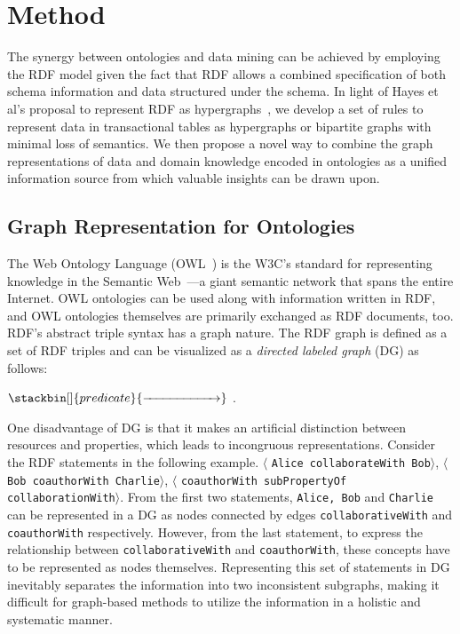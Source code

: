 \section{Method}
\label{sec:method}
The synergy between ontologies and data mining can be achieved by employing the RDF model given the fact that RDF allows a combined specification of both schema information and data structured under the schema. In light of Hayes et al's proposal to represent RDF as hypergraphs~\cite{GraphModelRDF}, we develop a set of rules to represent data in transactional tables as hypergraphs or bipartite graphs with minimal loss of semantics. We then propose a novel way to combine the graph representations of data and domain knowledge encoded in ontologies as a unified information source from which valuable insights can be drawn upon.

\subsection{Graph Representation for Ontologies}
The Web Ontology Language (OWL~\cite{OWL}) is the W3C's standard for representing knowledge in the Semantic Web~\cite{Berners-Lee01}---a giant semantic network that spans the entire Internet. OWL ontologies can be used along with information written in RDF, and OWL ontologies themselves are primarily exchanged as RDF documents, too. RDF's abstract triple syntax has a graph nature. The RDF graph is defined as a set of RDF triples and can be visualized as a \emph{directed labeled graph} (DG) as follows:
\begin{center} $\stackbin[]{predicate}{\xrightarrow{\hspace*{2cm}}}$ \;.\end{center}

One disadvantage of DG is that it makes an artificial distinction between resources and properties, which leads to incongruous representations. Consider the RDF statements in the following example. $\langle$ \texttt{Alice collaborateWith Bob}$\rangle$, $\langle$ \texttt{Bob coauthorWith Charlie}$\rangle$, $\langle$ \texttt{coauthorWith subPropertyOf collaborationWith}$\rangle$. From the first two statements, \texttt{Alice, Bob} and \texttt{Charlie} can be represented in a DG as nodes connected by edges \texttt{collaborativeWith} and \texttt{\texttt{coauthorWith}} respectively. However, from the last statement, to express the relationship between \texttt{collaborativeWith} and \texttt{coauthorWith}, these concepts have to be represented as nodes themselves. Representing this set of statements in DG inevitably separates the information into two inconsistent subgraphs, making it difficult for graph-based methods to utilize the information in a holistic and systematic manner.

